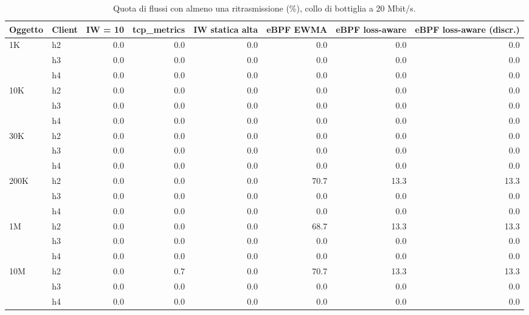 \begin{table}[htbp]
  \centering
  \caption{Quota di flussi con almeno una ritrasmissione (\%), collo di bottiglia a 20 Mbit/s.}
  \label{tab:retransflow-20}
  \begin{tabular}{llrrrrrr}
    \toprule
    Oggetto & Client & IW = 10 & tcp\_metrics & IW statica alta & eBPF EWMA & eBPF loss-aware & eBPF loss-aware (discr.) \\
    \midrule
    1K & h2 & 0.0 & 0.0 & 0.0 & 0.0 & 0.0 & 0.0 \\
     & h3 & 0.0 & 0.0 & 0.0 & 0.0 & 0.0 & 0.0 \\
     & h4 & 0.0 & 0.0 & 0.0 & 0.0 & 0.0 & 0.0 \\
    \addlinespace
    10K & h2 & 0.0 & 0.0 & 0.0 & 0.0 & 0.0 & 0.0 \\
     & h3 & 0.0 & 0.0 & 0.0 & 0.0 & 0.0 & 0.0 \\
     & h4 & 0.0 & 0.0 & 0.0 & 0.0 & 0.0 & 0.0 \\
    \addlinespace
    30K & h2 & 0.0 & 0.0 & 0.0 & 0.0 & 0.0 & 0.0 \\
     & h3 & 0.0 & 0.0 & 0.0 & 0.0 & 0.0 & 0.0 \\
     & h4 & 0.0 & 0.0 & 0.0 & 0.0 & 0.0 & 0.0 \\
    \addlinespace
    200K & h2 & 0.0 & 0.0 & 0.0 & 70.7 & 13.3 & 13.3 \\
     & h3 & 0.0 & 0.0 & 0.0 & 0.0 & 0.0 & 0.0 \\
     & h4 & 0.0 & 0.0 & 0.0 & 0.0 & 0.0 & 0.0 \\
    \addlinespace
    1M & h2 & 0.0 & 0.0 & 0.0 & 68.7 & 13.3 & 13.3 \\
     & h3 & 0.0 & 0.0 & 0.0 & 0.0 & 0.0 & 0.0 \\
     & h4 & 0.0 & 0.0 & 0.0 & 0.0 & 0.0 & 0.0 \\
    \addlinespace
    10M & h2 & 0.0 & 0.7 & 0.0 & 70.7 & 13.3 & 13.3 \\
     & h3 & 0.0 & 0.0 & 0.0 & 0.0 & 0.0 & 0.0 \\
     & h4 & 0.0 & 0.0 & 0.0 & 0.0 & 0.0 & 0.0 \\
    \bottomrule
  \end{tabular}
\end{table}
